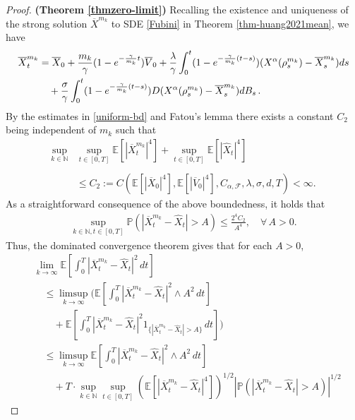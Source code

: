 \documentclass{ims9x6}
\newcommand{\nn}{\nonumber}
\newcommand{\EE}{\mathbb{E}}
\newcommand{\TE}{\mathcal{F}}
\newcommand{\NN}{\mathbb{N}}
\newcommand{\PP}{\mathbb{P}}
\newcommand{\OV}{\overline{V}}
\newcommand{\OX}{\overline{X}}
\begin{document}
\begin{proof}{\textbf{(Theorem \ref{thmzero-limit})}}
	Recalling the existence and uniqueness of the strong solution $\OX^{m_k}$ to SDE \eqref{Fubini} in Theorem \ref{thm-huang2021mean},  we have
{\small 	\begin{align}
\label{eq-X-mk}
	\OX_t^{m_k}&=\OX_0+\frac{m_k}{\gamma}(1-e^{-\frac{\gamma}{{m_k}}t})\OV_0
	+\frac{\lambda}{\gamma}\int_0^t(1-e^{-\frac{\gamma}{{m_k}}(t-s)}) (X^{\alpha}(\rho_s^{m_k})-\OX_s^{m_k})ds\\
	& \quad +\frac{\sigma}{\gamma}\int_0^t(1-e^{-\frac{\gamma}{{m_k}}(t-s)}) D(X^{\alpha}(\rho_s^{m_k})-\OX_s^{m_k})dB_s\notag\,. 
	\end{align}}
	By the estimates in \eqref{uniform-bd} and Fatou's lemma 
	there exists a constant $C_2 $ being independent of $m_k$ such that
	\begin{align}\label{estimate-L4-bd}  
	\sup_{k\in\mathbb N} & \sup_{t\in[0,T]}\EE \left[|\OX_t^{m_k}|^4\right]  +
	\sup_{t\in[0,T]} \EE\left[\left|\widehat X_t\right|^4 \right]\nn\\[-.25cm]
	\\[-.25cm]
	 & \leq  C_2:=C(\EE[|\OX_0|^4],\EE[|\OV_0|^4],C_{\alpha,\TE},\lambda,\sigma,d,T)<\infty.\nn
	\end{align}
	As a straightforward consequence of the above boundedness, it holds that
	\begin{align}
	\sup_{k\in \NN, t\in[0,T]} \PP(|\OX_t^{m_k} -\widehat X_t| > A)
	\leq \frac{2^4C_2}{A^4},\quad \forall\, A>0.
	\end{align}
	Thus, the dominated convergence theorem gives that for each $A>0$,
	\begin{align}
	&\lim_{k\rightarrow \infty}\EE\left[\int_0^T |\OX_t^{m_k}-\widehat X_t|^2\,dt \right] 
	\nonumber\\
	&\quad\leq
	\limsup_{k\rightarrow \infty}\bigg(\EE\left[\int_0^T |\OX_t^{m_k}-\widehat X_t|^2 \wedge A^2\,dt \right]\nn\\
	&\qquad+ \EE \left[\int_0^T |\OX_t^{m_k}-\widehat X_t|^2 1_{\{|\OX_t^{m_k}-\widehat X_t|>A\}}\,dt \right]  \bigg)
	\nonumber \\
	&\quad\leq
	\limsup_{k\rightarrow \infty}\EE\left[\int_0^T |\OX_t^{m_k}-\widehat X_t|^2 \wedge A^2\,dt \right]\nn\\
	&\qquad+T\cdot \sup_{k\in\mathbb N} \sup_{t\in[0,T]} \left(\EE \left[|\OX_t^{m_k}-\widehat X_t|^4\right] \right)^{1/2}   \left|  \PP(|\OX_t^{m_k} -\widehat X_t| > A) \right|^{1/2}

\end{align}
\end{proof}
\end{document}
